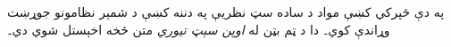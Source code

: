 \documentclass[../../../include/open-logic-section]{subfiles}
\begin{document}
	

\begin{editorial}
په دې څپرکي کښې مواد د ساده سټ نظريې په دننه کښې د شمېر نظامونو
جوړښت وړاندې کوي۔ دا د ټم بټن له \emph{اوپن سېټ تيوري} متن څخه
اخېستل شوي دي۔
\end{editorial}


\OLEndChapterHook
\end{document}

